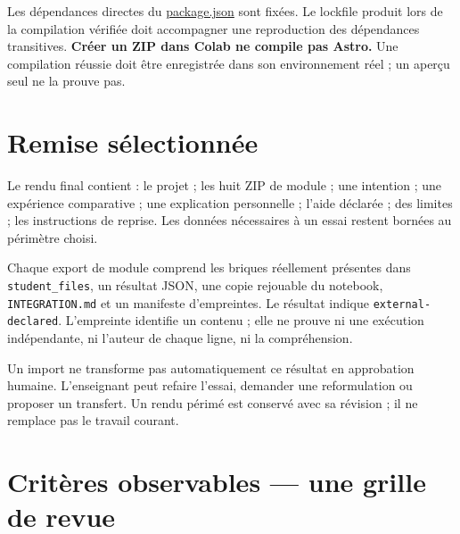\documentclass[
  canadien,
  11pt,
  a4paper,
]{report}
\begin{document}
Les dépendances directes du
\href{../../assembly/package.json}{package.json} sont fixées. Le
lockfile produit lors de la compilation vérifiée doit accompagner une
reproduction des dépendances transitives. \textbf{Créer un ZIP dans
Colab ne compile pas Astro.} Une compilation réussie doit être
enregistrée dans son environnement réel ; un aperçu seul ne la prouve
pas.

\section{Remise sélectionnée}\label{remise-suxe9lectionnuxe9e}

Le rendu final contient : le projet ; les huit ZIP de module ; une
intention ; une expérience comparative ; une explication personnelle ;
l'aide déclarée ; des limites ; les instructions de reprise. Les données
nécessaires à un essai restent bornées au périmètre choisi.

Chaque export de module comprend les briques réellement présentes dans
\texttt{student\_\allowbreak{}files}, un résultat JSON, une copie rejouable du
notebook, \texttt{INTEGRATION.md} et un manifeste d'empreintes. Le
résultat indique \texttt{external-declared}. L'empreinte identifie un
contenu ; elle ne prouve ni une exécution indépendante, ni l'auteur de
chaque ligne, ni la compréhension.

Un import ne transforme pas automatiquement ce résultat en approbation
humaine. L'enseignant peut refaire l'essai, demander une reformulation
ou proposer un transfert. Un rendu périmé est conservé avec sa révision
; il ne remplace pas le travail courant.

\section{Critères observables --- une grille de
revue}\label{crituxe8res-observables-une-grille-de-revue}
\end{document}
